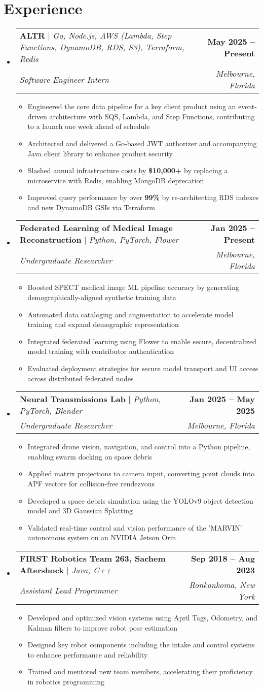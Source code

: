 \documentclass[letterpaper,11pt]{article}
\makeatletter
\newcommand{\resumeItem}[1]{
  \item\small{
    {#1 \vspace{-2pt}}
  }
}
\newcommand{\resumeSubheading}[4]{
  \vspace{-2pt}\item
    \begin{tabular*}{1.0\textwidth}[t]{l@{\extracolsep{\fill}}r}
      \small#1 & \textbf{\small #2} \\
      \textit{\small#3} & \textit{\small #4} \\
    \end{tabular*}\vspace{-9pt}
}
\newcommand{\resumeSubHeadingListStart}{\begin{itemize}[leftmargin=0.0in, label={}]}
\newcommand{\resumeSubHeadingListEnd}{\end{itemize}}
\newcommand{\resumeItemListStart}{\begin{itemize}}
\newcommand{\resumeItemListEnd}{\end{itemize}\vspace{-5pt}}
\makeatother
\begin{document}
\section{Experience}
  \resumeSubHeadingListStart
    \vspace{0pt}
    \resumeSubheading
    {\textbf{ALTR} $|$ \emph{Go, Node.js, AWS (Lambda, Step Functions, DynamoDB, RDS, S3), Terraform, Redis}}{May 2025 -- Present}
    {Software Engineer Intern}{Melbourne, Florida}
    \resumeItemListStart
      \resumeItem{Engineered the core data pipeline for a key client product using an event-driven architecture with SQS, Lambda, and Step Functions, contributing to a launch one week ahead of schedule}
      \resumeItem{Architected and delivered a Go-based JWT authorizer and accompanying Java client library to enhance product security}
      \resumeItem{Slashed annual infrastructure costs by \textbf{\$10,000+} by replacing a microservice with Redis, enabling MongoDB deprecation}
      \resumeItem{Improved query performance by over \textbf{99\%} by re-architecting RDS indexes and new DynamoDB GSIs via Terraform}
    \resumeItemListEnd
  \resumeSubheading
    {\textbf{Federated Learning of Medical Image Reconstruction} $|$ \emph{Python, PyTorch, Flower}}{Jan 2025 -- Present}
    {Undergraduate Researcher}{Melbourne, Florida}
    \resumeItemListStart
      \resumeItem{Boosted SPECT medical image ML pipeline accuracy by generating demographically-aligned synthetic training data}
      \resumeItem{Automated data cataloging and augmentation to accelerate model training and expand demographic representation}
      \resumeItem{Integrated federated learning using Flower to enable secure, decentralized model training with contributor authentication}
      \resumeItem{Evaluated deployment strategies for secure model transport and UI access across distributed federated nodes}
    \resumeItemListEnd
  \resumeSubheading
    {\textbf{Neural Transmissions Lab} $|$ \emph{Python, PyTorch, Blender}}{Jan 2025 -- May 2025}      
    {Undergraduate Researcher}{Melbourne, Florida}
    \resumeItemListStart
      \resumeItem{Integrated drone vision, navigation, and control into a Python pipeline, enabling swarm docking on space debris}
      \resumeItem{Applied matrix projections to camera input, converting point clouds into APF vectors for collision-free rendezvous}
      \resumeItem{Developed a space debris simulation using the YOLOv9 object detection model and 3D Gaussian Splatting}
      \resumeItem{Validated real-time control and vision performance of the 'MARVIN' autonomous system on an NVIDIA Jetson Orin}
    \resumeItemListEnd
  \resumeSubheading
    {\textbf{FIRST Robotics Team 263, Sachem Aftershock} $|$ \emph{Java, C++}}{Sep 2018 -- Aug 2023}
    {Assistant Lead Programmer}{Ronkonkoma, New York}
    \resumeItemListStart
      \resumeItem{Developed and optimized vision systems using April Tags, Odometry, and Kalman filters to improve robot pose estimation}
      \resumeItem{Designed key robot components including the intake and control systems to enhance performance and reliability}
      \resumeItem{Trained and mentored new team members, accelerating their proficiency in robotics programming}
    \resumeItemListEnd
\resumeSubHeadingListEnd
\end{document}
